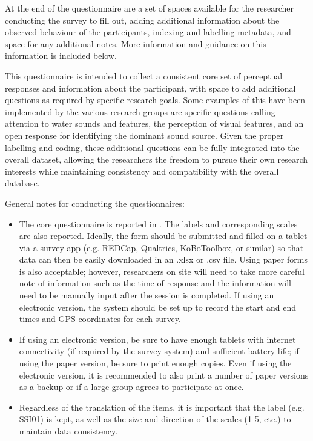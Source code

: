    At the end of the questionnaire are a set of spaces available for the researcher conducting the survey to fill out, adding additional information about the observed behaviour of the participants, indexing and labelling metadata, and space for any additional notes. More information and guidance on this information is included below.


   This questionnaire is intended to collect a consistent core set of perceptual responses and information about the participant, with space to add additional questions as required by specific research goals. Some examples of this have been implemented by the various research groups are specific questions calling attention to water sounds and features, the perception of visual features, and an open response for identifying the dominant sound source. Given the proper labelling and coding, these additional questions can be fully integrated into the overall dataset, allowing the researchers the freedom to pursue their own research interests while maintaining consistency and compatibility with the overall database.

   General notes for conducting the questionnaires:

   \begin{itemize}
     \item The core questionnaire is reported in . The labels and corresponding scales are also reported. Ideally, the form should be submitted and filled on a tablet via a survey app (e.g. REDCap, Qualtrics, KoBoToolbox, or similar) so that data can then be easily downloaded in an .xlsx or .csv file. Using paper forms is also acceptable; however, researchers on site will need to take more careful note of information such as the time of response and the information will need to be manually input after the session is completed. If using an electronic version, the system should be set up to record the start and end times and GPS coordinates for each survey.
     \item If using an electronic version, be sure to have enough tablets with internet connectivity (if required by the survey system) and sufficient battery life; if using the paper version, be sure to print enough copies. Even if using the electronic version, it is recommended to also print a number of paper versions as a backup or if a large group agrees to participate at once.
     \item Regardless of the translation of the items, it is important that the label (e.g. SSI01) is kept, as well as the size and direction of the scales (1-5, etc.) to maintain data consistency.
   \end{itemize}



